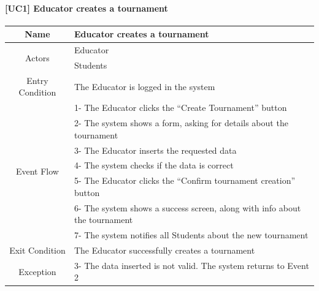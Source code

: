 \documentclass{article}
\begin{document}
\paragraph{[UC1] Educator creates a tournament}
\begin{center}
\begin{tabular}{|c|m{40em}|}
\hline
Name & Educator creates a tournament\\
\hline
\multirow{2}{4em}{Actors}
& Educator\\
& Students\\
\hline
Entry Condition & The Educator is logged in the system\\
\hline
\multirow{7}{4em}{Event Flow}
& 1- The Educator clicks the “Create Tournament” button\\
& 2- The system shows a form, asking for details about the tournament\\
& 3- The Educator inserts the requested data\\
& 4- The system checks if the data is correct\\
& 5- The Educator clicks the “Confirm tournament creation” button\\
& 6- The system shows a success screen, along with info about the tournament\\
& 7- The system notifies all Students about the new tournament\\
\hline
Exit Condition & The Educator successfully creates a tournament\\
\hline
Exception & 3- The data inserted is not valid. The system returns to Event 2\\
\hline
\end{tabular}
\end{center}
\end{document}

